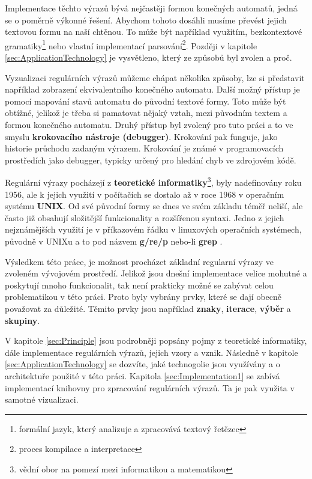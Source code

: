 Implementace těchto výrazů bývá nejčastěji formou konečných automatů, jedná se o poměrně výkonné řešení. 
Abychom tohoto dosáhli musíme převést jejich textovou formu na naší chtěnou.
To může být například využitím, bezkontextové gramatiky\footnote{formální jazyk, který analizuje a zpracovává textový řetězec} nebo vlastní implementací parsování\footnote{proces kompilace a interpretace}.
Později v kapitole \ref{sec:ApplicationTechnology} je vysvětleno, který ze způsobů byl zvolen a proč.

Vyzualizaci regulárních výrazů můžeme chápat několika způsoby, 
lze si představit například zobrazení ekvivalentního konečného automatu.
Další možný přístup je pomocí mapování stavů automatu do původní textové formy. 
Toto může být obtížné, jelikož je třeba si pamatovat nějaký vztah, 
mezi původním textem a formou konečného automatu. 
Druhý přístup byl zvolený pro tuto
práci a to ve smyslu \textbf{krokovacího nástroje (debugger)}. Krokování pak funguje, jako historie průchodu zadaným výrazem. 
Krokování je známé v programovacích prostředích jako debugger,
typicky určený pro hledání chyb ve zdrojovém kódě.

Regulární výrazy pocházejí z \textbf{teoretické informatiky}\footnote{vědní obor na pomezí mezi informatikou a matematikou}, 
byly nadefinovány roku 1956, ale k jejich využití v počítačích se dostalo až v roce 1968 v operačním systému \textbf{UNIX}.
Od své původní formy se dnes ve svém základu téměř neliší, ale často již obsahují složitější funkcionality a rozšířenou syntaxi.
Jedno z jejich nejznámějších využití je v příkazovém řádku v linuxových operačních systémech, původně v UNIXu a to pod názvem \textbf{g/re/p} nebo-li \textbf{grep} 
\cite{Wikipedia_2024}. 

Výsledkem této práce, je možnost procházet základní regularní výrazy ve zvoleném vývojovém prostředí. 
Jelikož jsou dnešní implementace velice mohutné a poskytují mnoho funkcionalit, tak není prakticky možné
se zabývat celou problematikou v této práci. 
Proto byly vybrány prvky, které se dají obecně považovat za důležité. 
Těmito prvky jsou například \textbf{znaky}, \textbf{iterace}, \textbf{výběr} a \textbf{skupiny}.

V kapitole \ref{sec:Principle} jsou podrobněji popsány pojmy z teoretické informatiky, dále implementace regulárních výrazů, jejich vzory a vznik.
Následně v kapitole \ref{sec:ApplicationTechnology} se dozvíte, jaké technogolie jsou využívány a o architektuře použité v této práci.
Kapitola \ref{sec:Implementation1} se zabívá implementací knihovny pro zpracování regulárních výrazů. 
Ta je pak využita v samotné vizualizaci.

\endinput